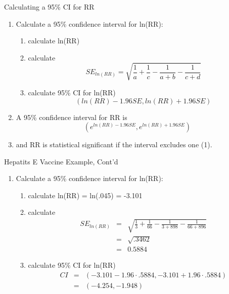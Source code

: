 \documentclass[14pt]{beamer}\usepackage[]{graphicx}\usepackage[]{color}
\begin{document}
\begin{frame}[fragile]{Calculating a 95\% CI for RR}

{\small{
\begin{enumerate}
\item<1-> Calculate a 95\% confidence interval for ln(RR):
  \begin{enumerate}
  \item<2-> calculate ln(RR)
  \item<3-> calculate
  \begin{equation*}
    SE_{ln(RR)} = \sqrt{\frac{1}{a} + \frac{1}{c} - \frac{1}{a+b} - \frac{1}{c+d}}
  \end{equation*}
  \item<4-> calculate 95\% CI for ln(RR)
  \begin{equation*}
    (ln(RR) - 1.96 SE, ln(RR) + 1.96 SE )
  \end{equation*}
  \end{enumerate}
\item<5-> A 95\% confidence interval for RR is
\begin{equation*}
    (e^{ln(RR) - 1.96 SE}, e^{ln(RR) + 1.96 SE} )
  \end{equation*}
  
\item<6-> and RR is statistical significant if the interval excludes one (1).
\end{enumerate}
}}
\end{frame}

\begin{frame}[fragile]{Hepatits E Vaccine Example, Cont'd}

{\small{
\begin{enumerate}
\item<1-> Calculate a 95\% confidence interval for ln(RR):
  \begin{enumerate}
  \item<2-> calculate ln(RR) = ln(.045) = -3.101
  \item<3-> calculate
  \begin{eqnarray*}
    SE_{ln(RR)} &=& \sqrt{\frac{1}{3} + \frac{1}{66} - \frac{1}{3+898} - \frac{1}{66+896}}  \\
    &=& \sqrt{.3462} \\
    &=& 0.5884 
  \end{eqnarray*}
  \item<4-> calculate 95\% CI for ln(RR)
  \begin{eqnarray*}
    CI &=& (-3.101-1.96 \cdot .5884, -3.101+1.96 \cdot .5884) \\
    &=& (-4.254, -1.948)
  \end{eqnarray*}
  \end{enumerate}
\end{enumerate}  
}}
\end{frame}
\end{document}
